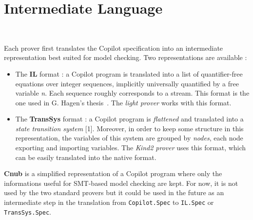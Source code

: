 \section{Intermediate Language}~\label{sec:il}




Each prover first translates the Copilot specification into an
intermediate representation best suited for model checking. Two
representations are available :

\begin{itemize}
\item
  The \textbf{IL} format : a Copilot program is translated into a list
  of quantifier-free equations over integer sequences, implicitly
  universally quantified by a free variable \emph{n}. Each sequence
  roughly corresponds to a stream. This format is the one used in G.
  Hagen's thesis~\cite{HagenPhD}. The \emph{light prover} works with this
  format.
\item
  The \textbf{TransSys} format : a Copilot program is \emph{flattened}
  and translated into a \emph{state transition system} {[}1{]}.
  Moreover, in order to keep some structure in this representation, the
  variables of this system are grouped by \emph{nodes}, each node
  exporting and importing variables. The \emph{Kind2 prover} uses this
  format, which can be easily translated into the native format.
\end{itemize}

\textbf{Cnub} is a simplified representation of a Copilot program where
only the informations useful for SMT-based model checking are kept. For
now, it is not used by the two standard provers but it could be used in
the future as an intermediate step in the translation from
\texttt{Copilot.Spec} to \texttt{IL.Spec} or \texttt{TransSys.Spec}.


